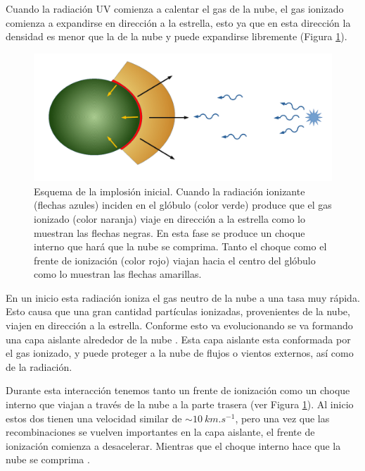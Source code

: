 \documentclass{book}
\begin{document}
Cuando la radiación UV comienza a calentar el gas de la nube, el gas
ionizado comienza a expandirse en dirección a la estrella, esto ya que
en esta dirección la densidad es menor que la de la nube y puede
expandirse libremente (Figura \ref{fig:evolucion de la nube}).

\begin{figure}[htb]
    \centering
    \includegraphics[width= \textwidth]{ultimos/implosion_inicial.pdf}
    \caption{Esquema de la implosión inicial. Cuando la radiación
      ionizante (flechas azules) inciden en el glóbulo (color verde)
      produce que el gas ionizado (color naranja) viaje en dirección a
      la estrella como lo muestran las flechas negras. En esta fase se
      produce un choque interno que hará que la nube se comprima.
      Tanto el choque como el frente de ionización (color rojo) viajan
      hacia el centro del glóbulo como lo muestran las flechas
      amarillas.}
    \label{fig:evolucion de la nube}
\end{figure}

En un inicio esta radiación ioniza el gas neutro de la nube a una tasa
muy rápida. Esto causa que una gran cantidad partículas ionizadas,
provenientes de la nube, viajen en dirección a la estrella. Conforme
esto va evolucionando se va formando una capa aislante alrededor de la
nube \citep{OortySpitzer_1955}. Esta capa aislante esta conformada por
el gas ionizado, y puede proteger a la nube de flujos o vientos
externos, así como de la radiación.

Durante esta interacción tenemos tanto un frente de ionización como un
choque interno que viajan a través de la nube a la parte trasera (ver
Figura \ref{fig:evolucion de la nube}). Al inicio estos dos tienen una
velocidad similar de $\sim\SI{10}{km.s^{-1}}$, pero una vez que las
recombinaciones se vuelven importantes en la capa aislante, el frente
de ionización comienza a desacelerar. Mientras que el choque interno
hace que la nube se comprima \citep{Bertoldi_1989}.
\end{document}
